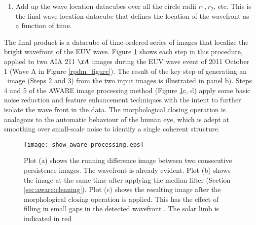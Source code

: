 \begin{enumerate}
\begin{enumerate}
\item Apply a morphological closing operation.  This operation helps
  close small ‘cracks’ in structures \citep{2002dip..book.....G}.  The
  structuring element used is the same as that used by the median
  filtering operation. The final image is shown in Figure
  \ref{method_figure}d.  The final result is a datacube of images that
  show the location of the wavefront as a function of time, given the
  median filter and closing operations performed at length-scale $r$.
\end{enumerate}

\item Add up the wave location datacubes over all the circle radii
  $r_{1}, r_{2}$\textellipsis, etc.  This is the final wave location
  datacube that defines the location of the wavefront as a function of
  time.

\end{enumerate}

The final product is a datacube of time-ordered series of images that
localize the bright wavefront of the EUV wave.  Figure
\ref{method_figure} shows each step in this procedure, applied to two
AIA 211 $\AA$ images during the EUV wave event of 2011 October 1 (Wave
A in Figure \ref{rpdm_figure}).  The result of the key step of
generating an \RDP\ image (Steps 2 and 3) from the two input images is
illustrated in panel b). Steps 4 and 5 of the AWARE image processing
method (Figure \ref{method_figure}c, d) apply some basic noise
reduction and feature enhancement techniques with the intent to
further isolate the wave front in the data. The morphological closing
operation is analagous to the automatic behaviour of the human eye,
which is adept at smoothing over small-scale noise to identify a
single coherent structure.

\begin{figure}
\begin{center}
\texttt{[image: show\_aware\_processing.eps]}
\caption{Plot (a) shows the running difference image between two
  consecutive persistence images. The wavefront is already
  evident. Plot (b) shows the image at the same time after applying
  the median filter (Section \ref{sec:aware:cleaning}).  Plot (c)
  shows the resulting image after the morphological closing operation
  is applied.  This has the effect of filling in small gaps in the
  detected wavefront \citep[e.g.][]{2002dip..book.....G}. The solar
  limb is indicated in red}
\label{method_figure}
\end{center}
\end{figure}


